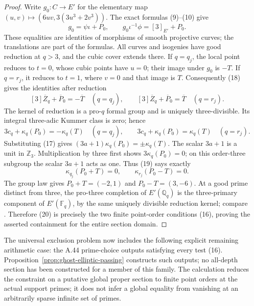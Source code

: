\begin{proof}
Write \(g_0:C\to E'\) for the elementary map
\((u,v)\mapsto(6uv,3(3u^3+2v^3))\). The exact
formulas (9)--(10) give
\[
 g_0=\psi\iota+P_0,
 \qquad
 g_0\iota^{-1}\phi=[3]_{E'}+P_0.                 \tag{18}
\]
These equalities are identities of morphisms of
smooth projective curves; the translations are
part of the formulas. All curves and isogenies
have good reduction at \(q>3\), and the cubic
cover extends there. If \(q=q_j\), the local
point reduces to \(t=0\), whose cubic points
have \(u=0\); their image under \(g_0\) is
\(-T\). If \(q=r_j\), it reduces to \(t=1\),
where \(v=0\) and that image is \(T\).
Consequently (18) gives the identities after
reduction
\[
 [3]\overline Z_q+\overline P_0=-\overline T
       \quad(q=q_j),\qquad
 [3]\overline Z_q+\overline P_0=\overline T
       \quad(q=r_j).
\]
The kernel of reduction is a pro-\(q\) formal
group and is uniquely three-divisible. Its
integral three-adic Kummer class is zero; hence
\[
 3c_q+\kappa_q(P_0)=-\kappa_q(T)\quad(q=q_j),
 \qquad
 3c_q+\kappa_q(P_0)=\kappa_q(T)\quad(q=r_j).
                                                        \tag{19}
\]
Substituting (17) gives
\((3a+1)\kappa_q(P_0)=\pm\kappa_q(T)\).
The scalar \(3a+1\) is a unit in \(\mathbb Z_3\).
Multiplication by three first shows
\(3\kappa_q(P_0)=0\); on this order-three
subgroup the scalar \(3a+1\) acts as one.
Thus (19) says exactly
\[
       \kappa_{q_j}(P_0+T)=0,
             \qquad\kappa_{r_j}(P_0-T)=0.             \tag{20}
\]
The group law gives
\(P_0+T=(-2,1)\) and \(P_0-T=(3,-6)\).
At a good prime distinct from three, the pro-three
completion of \(E'(\mathbb Q_q)\) is the
three-primary component of \(E'(\mathbb F_q)\),
by the same uniquely divisible reduction kernel;
compare \cite[IV.3.2]{GhostMilneEC}.
Therefore (20) is precisely the two finite point-order
conditions (16), proving the asserted containment
for the entire section domain.
\end{proof}

The universal exclusion problem now includes the
following explicit remaining arithmetic case:
the A.44 prime-choice outputs satisfying every
test (16). Proposition~\ref{prop:ghost-elliptic-passing}
constructs such outputs; no all-depth section has been
constructed for a member of this family. The calculation reduces the
constraint on a putative global proper section to
finite point orders at the actual support primes;
it does not infer a global equality from vanishing
at an arbitrarily sparse infinite set of primes.
